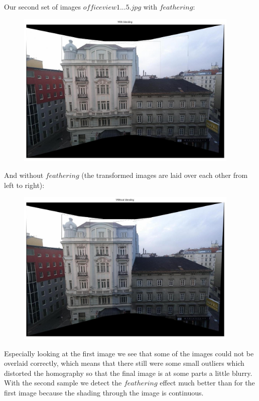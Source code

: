\documentclass[subfigure,epsfig,fleqn,float,numbers=noenddot]{scrartcl}
\begin{document}
Our second set of images $officeview1...5.jpg$ with $feathering$:
\begin{figure}[H]
		\centering
		\includegraphics[width=0.95\textwidth]{./img/withBlending2.jpg}
		\caption{}
		\label{img:withBlend2}
\end{figure}
And without $feathering$ (the transformed images are laid over each other from left to right):
\begin{figure}[H]
		\centering
		\includegraphics[width=0.95\textwidth]{./img/withoutBlending2.jpg}
		\caption{}
		\label{img:withoutBlend2}
\end{figure}

Especially looking at the first image we see that some of the images could not be overlaid correctly, which means that there still were some small outliers which distorted the homography so that the final image is at some parts a little blurry. 
With the second sample we detect the $feathering$ effect much better than for the first image because the shading through the image is continuous. 
\end{document}
